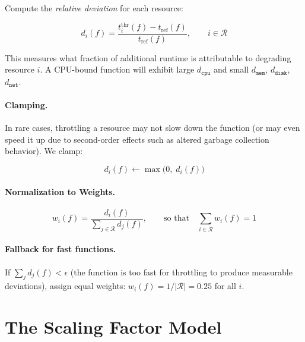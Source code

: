 \documentclass[11pt, a4paper]{article}
\begin{document}
Compute the \emph{relative deviation} for each resource:

\begin{equation}
\label{eq:deviation}
    d_i(f) = \frac{t_i^{\mathrm{thr}}(f) - t_{\mathrm{ref}}(f)}{t_{\mathrm{ref}}(f)},
    \qquad i \in \mathcal{R}
\end{equation}

This measures what fraction of additional runtime is attributable to degrading
resource $i$. A CPU-bound function will exhibit large $d_{\texttt{cpu}}$ and
small $d_{\texttt{mem}}$, $d_{\texttt{disk}}$, $d_{\texttt{net}}$.

\paragraph{Clamping.}
In rare cases, throttling a resource may not slow down the function (or may
even speed it up due to second-order effects such as altered garbage collection
behavior). We clamp:

\begin{equation}
\label{eq:clamp}
    d_i(f) \leftarrow \max\bigl(0,\; d_i(f)\bigr)
\end{equation}

\paragraph{Normalization to Weights.}

\begin{equation}
\label{eq:weights}
    w_i(f) = \frac{d_i(f)}{\displaystyle\sum_{j \in \mathcal{R}} d_j(f)},
    \qquad \text{so that} \quad \sum_{i \in \mathcal{R}} w_i(f) = 1
\end{equation}

\paragraph{Fallback for fast functions.}
If $\sum_j d_j(f) < \epsilon$ (the function is too fast for throttling to
produce measurable deviations), assign equal weights:
$w_i(f) = 1/|\mathcal{R}| = 0.25$ for all $i$.

\section{The Scaling Factor Model}
\label{sec:scaling}
\end{document}
